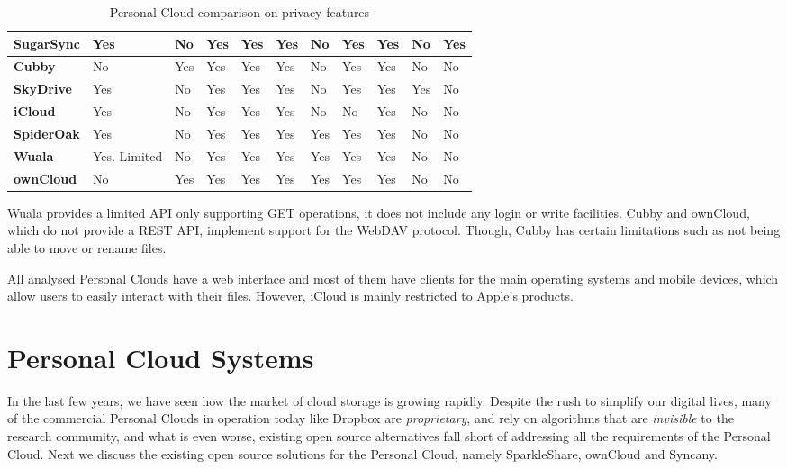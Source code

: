 {\begin{table}
\begin{center}
\begin{tabular}{ | p{3.0cm} | p{0.9cm} | p{0.9cm} | p{0.9cm} | p{0.9cm} | p{0.9cm} | p{0.9cm} | p{0.9cm} | p{0.9cm} | p{0.9cm} | p{0.9cm} | }
	\textbf{SugarSync} & 
	Yes &
	No &
	Yes &
	Yes &
	Yes &
	No &
	Yes &
	Yes &
	No &
	Yes \\ \hline
	
	\textbf{Cubby} &
	No &
	Yes &
	Yes &
	Yes &
	Yes &
	No &
	Yes &
	Yes &
	No &
	No \\ \hline
	
	\textbf{SkyDrive} & 
	Yes &
	No &
	Yes &
	Yes &
	Yes &
	No &
	Yes &
	Yes &
	Yes &
	No \\ \hline

	\textbf{iCloud} &
	Yes &
	No &
	Yes &
	Yes &
	Yes &
	No &
	No &
	Yes &
	No &
	No \\ \hline
	
	\textbf{SpiderOak} & 
	Yes &
	No &
	Yes &
	Yes &
	Yes &
	Yes &
	Yes &
	Yes &
	No &
	No \\ \hline

	\textbf{Wuala} &
	Yes. Limited &
	No &
	Yes &
	Yes &
	Yes &
	Yes &
	Yes &
	Yes &
	No &
	No \\ \hline
	
	\textbf{ownCloud} &
	No &
	Yes &
	Yes &
	Yes &
	Yes &
	Yes &
	Yes &
	Yes &
	No &
	No \\ \hline
    \end{tabular}
    \caption{Personal Cloud comparison on privacy features}
    \label{tab:pc_platform}
\end{center}
\end{table}
}

Wuala provides a limited API only supporting GET operations, it does not include any login or write facilities. Cubby and ownCloud, which do not provide a REST API, implement support for the WebDAV protocol. Though, Cubby has certain limitations such as not being able to move or rename files.

All analysed Personal Clouds have a web interface and most of them have clients for the main operating systems and mobile devices, which allow users to easily interact with their files. However, iCloud is mainly restricted to Apple's products.

\section{Personal Cloud Systems}

In the last few years, we have seen how the market of cloud storage is growing rapidly. 
Despite the rush to simplify our digital lives, many of the commercial Personal Clouds
in operation today like Dropbox are \textit{proprietary}, and rely on algorithms that are
\textit{invisible} to the research community, and what is even worse, existing open source
alternatives fall short of addressing all the requirements of the Personal Cloud.
Next we discuss the existing open source solutions for the Personal Cloud, namely
SparkleShare, ownCloud and Syncany.

